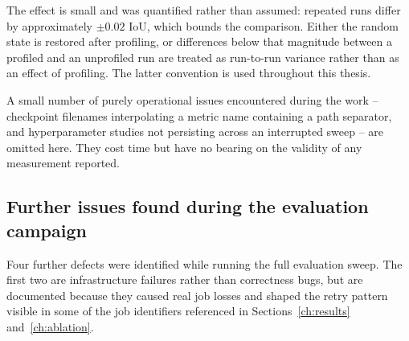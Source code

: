 The effect is small and was quantified rather than assumed: repeated runs differ
by approximately $\pm 0.02$ IoU, which bounds the comparison. Either the random
state is restored after profiling, or differences below that magnitude between a
profiled and an unprofiled run are treated as run-to-run variance rather than as
an effect of profiling. The latter convention is used throughout this thesis.

A small number of purely operational issues encountered during the work --
checkpoint filenames interpolating a metric name containing a path separator,
and hyperparameter studies not persisting across an interrupted sweep -- are
omitted here. They cost time but have no bearing on the validity of any
measurement reported.

\subsection{Further issues found during the evaluation campaign}
\label{sec:defects-session2}

Four further defects were identified while running the full evaluation sweep.
The first two are infrastructure failures rather than correctness bugs, but are
documented because they caused real job losses and shaped the retry pattern
visible in some of the job identifiers referenced in Sections~\ref{ch:results}
and~\ref{ch:ablation}.

